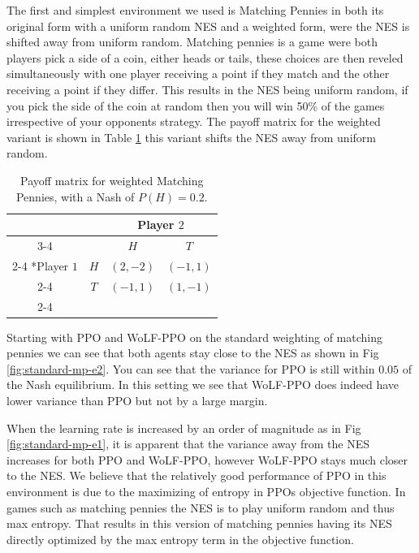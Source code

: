 \documentclass[conference]{IEEEtran}
\begin{document}
The first and simplest environment we used is Matching Pennies in both its original form with a uniform random NES and a weighted form, were the NES is shifted away from uniform random. Matching pennies is a game were both players pick a side of a coin, either heads or tails, these choices are then reveled simultaneously with one player receiving a point if they match and the other receiving a point if they differ. This results in the NES being uniform random, if you pick the side of the coin at random then you will win 50\% of the games irrespective of your opponents strategy. The payoff matrix for the weighted variant is shown in Table \ref{tab:weighted-mp} this variant shifts the NES away from uniform random.

\begin{table}[!ht]
    \centering
    \setlength{\extrarowheight}{2pt}
    \begin{tabular}{*{4}{c|}}
      \multicolumn{2}{c}{} & \multicolumn{2}{c}{Player $2$}\\\cline{3-4}
      \multicolumn{1}{c}{} &  & $H$  & $T$ \\\cline{2-4}
      \multirow{2}*{Player $1$}  & $H$ & $(2,-2)$ & $(-1,1)$ \\\cline{2-4}
      & $T$ & $(-1,1)$ & $(1,-1)$ \\\cline{2-4}
    \end{tabular}
    \caption{Payoff matrix for weighted Matching Pennies, with a Nash of $P(H)=0.2$.}
    \label{tab:weighted-mp}
\end{table}

Starting with PPO and WoLF-PPO on the standard weighting of matching pennies we can see that both agents stay close to the NES as shown in Fig \ref{fig:standard-mp-e2}. You can see that the variance for PPO is still within $0.05$ of the Nash equilibrium. In this setting we see that WoLF-PPO does indeed have lower variance than PPO but not by a large margin.

When the learning rate is increased by an order of magnitude as in Fig \ref{fig:standard-mp-e1}, it is apparent that the variance away from the NES increases for both PPO and WoLF-PPO, however WoLF-PPO stays much closer to the NES. We believe that the relatively good performance of PPO in this environment is due to the maximizing of entropy in PPOs objective function. In games such as matching pennies the NES is to play uniform random and thus max entropy. That results in this version of matching pennies having its NES directly optimized by the max entropy term in the objective function.
\end{document}
